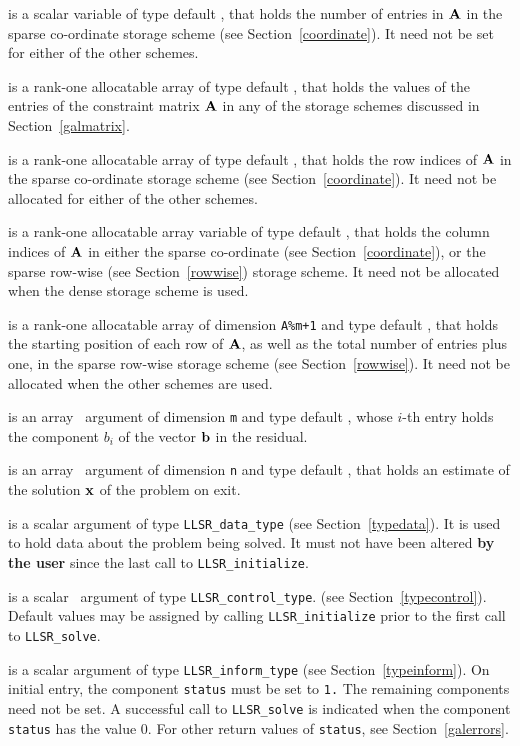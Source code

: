 \documentclass{galahad}
\newcommand{\packagename}{LLSR}
\begin{document}
\begin{description}
\begin{description}
 is a scalar variable of type default \integer, that
holds the number of entries in ${\mathbf{A}}$
in the sparse co-ordinate storage scheme (see Section~\ref{coordinate}).
It need not be set for either of the other schemes.

 is a rank-one allocatable array of type default \realdp, that holds
the values of the entries of the constraint matrix ${\mathbf{A}}$ in any of the
storage schemes discussed in Section~\ref{galmatrix}.

 is a rank-one allocatable array of type default \integer,
that holds the row indices of ${\mathbf{A}}$ in the sparse co-ordinate storage
scheme (see Section~\ref{coordinate}).
It need not be allocated for either of the other schemes.

 is a rank-one allocatable array variable of type default \integer,
that holds the column indices of ${\mathbf{A}}$ in either the sparse co-ordinate
(see Section~\ref{coordinate}), or the sparse row-wise
(see Section~\ref{rowwise}) storage scheme.
It need not be allocated when the dense storage scheme is used.

 is a rank-one allocatable array of dimension {\tt A\%m+1} and type
default \integer, that holds the starting position of
each row of ${\mathbf{A}}$, as well
as the total number of entries plus one, in the sparse row-wise storage
scheme (see Section~\ref{rowwise}). It need not be allocated when the
other schemes are used.
\end{description}

 is an array \intentin\ argument of dimension {\tt m} and
type default \realdp,  whose $i$-th entry holds the component $b_i$ of
the vector ${\mathbf{b}}$ in the residual.

 is an array \intentout\ argument of dimension {\tt n} and
type default \realdp, that holds an estimate of the solution ${\mathbf{x}}$
of the problem on exit.

 is a scalar \intentinout argument of type
{\tt \packagename\_data\_type}
(see Section~\ref{typedata}). It is used to hold data about the problem being
solved. It must not have been altered {\bf by the user} since the last call to
{\tt \packagename\_initialize}.

 is a scalar \intentin\ argument of type
{\tt \packagename\_control\_type}.
(see Section~\ref{typecontrol}).
Default values may be assigned by calling {\tt \packagename\_initialize}
prior to the first call to {\tt \packagename\_solve}.

 is a scalar \intentinout argument of type
{\tt \packagename\_inform\_type}
(see Section~\ref{typeinform}).
On initial entry, the component {\tt status} must be set to {\tt 1.}
The remaining components need not be set.
A successful call to
{\tt \packagename\_solve}
is indicated when the  component {\tt status} has the value 0.
For other return values of {\tt status}, see Section~\ref{galerrors}.


\end{description}
\end{document}
